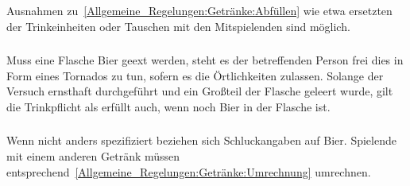 \subsubsection{}
Ausnahmen zu~\ref{Allgemeine_Regelungen:Getränke:Abfüllen} wie etwa ersetzten der Trinkeinheiten oder Tauschen mit den Mitspielenden sind möglich.

\subsubsection{}
Muss eine Flasche Bier geext werden, steht es der betreffenden Person frei dies in Form eines Tornados zu tun, sofern es die Örtlichkeiten zulassen.
Solange der Versuch ernsthaft durchgeführt und ein Großteil der Flasche geleert wurde, gilt die Trinkpflicht als erfüllt auch, wenn noch Bier in der Flasche ist.

\subsubsection{}
Wenn nicht anders spezifiziert beziehen sich Schluckangaben auf Bier.
Spielende mit einem anderen Getränk müssen entsprechend~\ref{Allgemeine_Regelungen:Getränke:Umrechnung} umrechnen.
